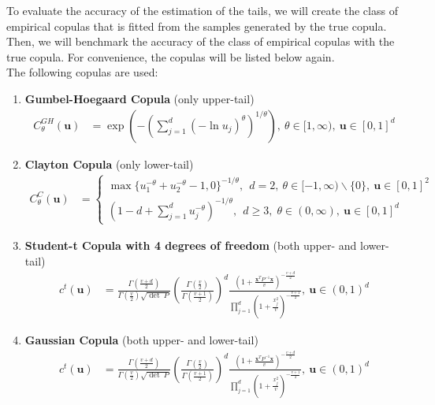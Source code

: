 \documentclass[12pt]{report}
\newcommand{\1}{\mathbf{1}}
\begin{document}
\begin{flushleft}
To evaluate the accuracy of the estimation of the tails, we will create the class of empirical copulas that is fitted from the samples generated by the true copula. Then, we will benchmark the accuracy of the class of empirical copulas with the true copula. For convenience, the copulas will be listed below again. \\
\vspace{0.5cm}
The following copulas are used:
\begin{enumerate}
\item \textbf{Gumbel-Hoegaard Copula} (only upper-tail) 
\begin{align*}
C^{GH}_{\theta}(\textbf{u}) &= \exp \left( -( \sum\limits_{j = 1}^{d} (- \ln u_{j})^{\theta})^{1/\theta} \right), \: \theta \in [1,\infty), \: \textbf{u} \in [0,1]^{d}
\end{align*}
\item \textbf{Clayton Copula} (only lower-tail) 
\begin{align*}
C^{C}_{\theta}(\textbf{u}) &= \left\{
\begin{array}{ll} 
\max \{ u_{1}^{-\theta} + u_{2}^{-\theta} - 1, 0 \}^{-1/\theta}, \: \: d = 2, \: \theta \in [-1,\infty) \backslash \{ 0 \}, \: \textbf{u} \in [0,1]^{2} \\
(1 - d + \sum_{j = 1}^{d} u^{- \theta}_{j} )^{-1/\theta}, \: \: d \ge 3, \; \theta \in (0,\infty), \: \textbf{u} \in [0,1]^{d}
\end{array} 
\right.
\end{align*}
\item \textbf{Student-t Copula with 4 degrees of freedom} (both upper- and lower-tail)
\begin{align*}
 c^{t}(\textbf{u}) &= \frac{\Gamma(\frac{v+d}{2})}{\Gamma(\frac{v}{2})\sqrt{\det \: P}} \left( \frac{\Gamma(\frac{v}{2})}{\Gamma(\frac{v+1}{2})} \right)^{d} \frac{ (1 + \frac{\textbf{x}^{T}P^{-1}\textbf{x}}{v})^{-\frac{v+d}{2}}}{\prod_{j = 1}^{d} (1 + \frac{x_{j}^{2}}{v})^{-\frac{v+1}{2}}} , \: \textbf{u} \in (0,1)^{d}
\end{align*}
\newpage
\item \textbf{Gaussian Copula} (both upper- and lower-tail) 
\begin{align*}
 c^{t}(\textbf{u}) &= \frac{\Gamma(\frac{v+d}{2})}{\Gamma(\frac{v}{2})\sqrt{\det \: P}} \left( \frac{\Gamma(\frac{v}{2})}{\Gamma(\frac{v+1}{2})} \right)^{d} \frac{ (1 + \frac{\textbf{x}^{T}P^{-1}\textbf{x}}{v})^{-\frac{v+d}{2}}}{\prod_{j = 1}^{d} (1 + \frac{x_{j}^{2}}{v})^{-\frac{v+1}{2}}} , \: \textbf{u} \in (0,1)^{d}
\end{align*}
\end{enumerate}


\end{flushleft}
\end{document}
